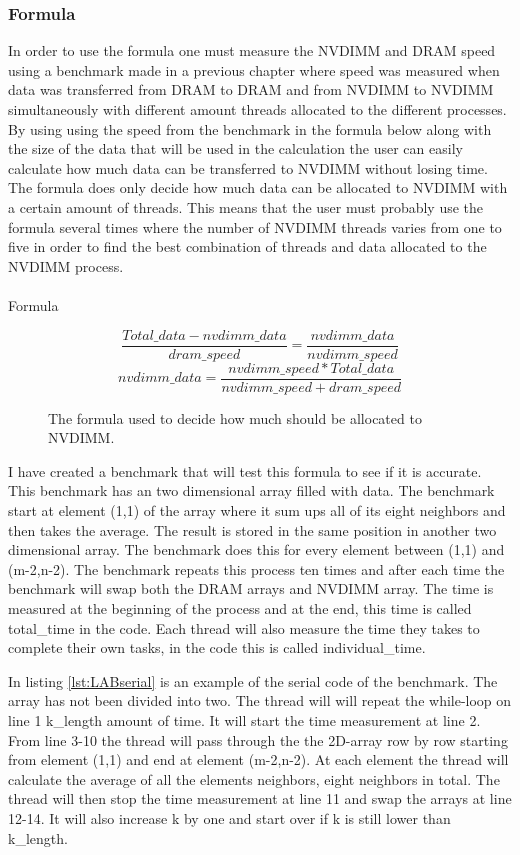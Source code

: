 \documentclass[12pt,a4paper,USenglish]{article}      %
\begin{document}
\subsubsection{Formula}
In order to use the formula one must measure the NVDIMM and DRAM speed using a benchmark made in a previous chapter where speed was measured when data was transferred from DRAM to DRAM and from NVDIMM to NVDIMM simultaneously with different amount threads allocated to the different processes. By using using the speed from the benchmark in the formula below along with the size of the data that will be used in the calculation the user can easily calculate how much data can be transferred to NVDIMM without losing time. The formula does only decide how much data can be allocated to NVDIMM with a certain amount of threads. This means that the user must probably use the formula several times where the number of NVDIMM threads varies from one to five in order to find the best combination of threads and data allocated to the NVDIMM process. 
\\
\\
Formula
\begin{figure}
\[
    \frac{Total\_data-nvdimm\_data}{dram\_speed} = \frac{nvdimm\_data}{nvdimm\_speed}    
\]
\[
    nvdimm\_data = \frac{nvdimm\_speed*Total\_data}{nvdimm\_speed+dram\_speed}    
\]
\caption{The formula used to decide how much should be allocated to NVDIMM.}
\label{fig:mathFormula}
\end{figure}

I have created a benchmark that will test this formula to see if it is accurate.
This benchmark has an two dimensional array filled with data. The benchmark start at element (1,1) of the array where it sum ups all of its eight neighbors and then takes the average. The result is stored in the same position in another two dimensional array. The benchmark does this for every element between (1,1) and (m-2,n-2). 
The benchmark repeats this process ten times and after each time the benchmark will swap both the DRAM arrays and NVDIMM array. The time is measured at the beginning of the process and at the end, this time is called total\_time in the code.
Each thread will also measure the time they takes to complete their own tasks, in the code this is called individual\_time.

In listing \ref{lst:LABserial} is an example of the serial code of the benchmark. The array has not been divided into two.
The thread will will repeat the while-loop on line 1 k\_length amount of time. It will start the time measurement at line 2. From line 3-10 the thread will pass through the the 2D-array row by row starting from element (1,1) and end at element (m-2,n-2). At each element the thread will calculate the average of all the elements neighbors, eight neighbors in total.
The thread will then stop the time measurement at line 11 and swap the arrays at line 12-14.
It will also increase k by one and start over if k is still lower than k\_length.
\end{document}
